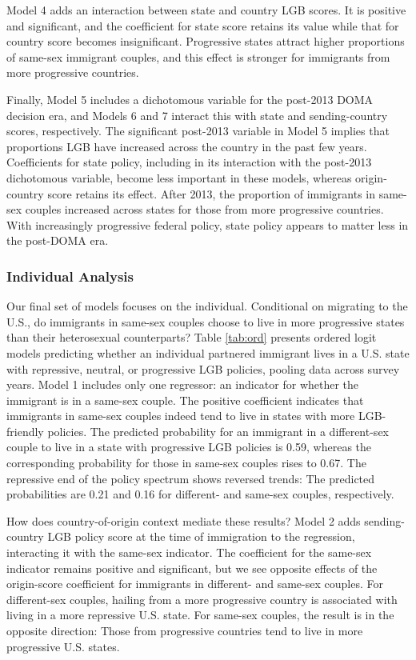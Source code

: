 \documentclass[
  11pt,
]{article}
\begin{document}
Model 4 adds an interaction between state and country LGB scores. It is positive and significant, and the coefficient for state score retains its value while that for country score becomes insignificant. Progressive states attract higher proportions of same-sex immigrant couples, and this effect is stronger for immigrants from more progressive countries.

Finally, Model 5 includes a dichotomous variable for the post-2013 DOMA decision era, and Models 6 and 7 interact this with state and sending-country scores, respectively. The significant post-2013 variable in Model 5 implies that proportions LGB have increased across the country in the past few years. Coefficients for state policy, including in its interaction with the post-2013 dichotomous variable, become less important in these models, whereas origin-country score retains its effect. After 2013, the proportion of immigrants in same-sex couples increased across states for those from more progressive countries. With increasingly progressive federal policy, state policy appears to matter less in the post-DOMA era.

\hypertarget{individual-analysis}{%
\subsubsection{Individual Analysis}\label{individual-analysis}}

Our final set of models focuses on the individual. Conditional on migrating to the U.S., do immigrants in same-sex couples choose to live in more progressive states than their heterosexual counterparts? Table \ref{tab:ord} presents ordered logit models predicting whether an individual partnered immigrant lives in a U.S. state with repressive, neutral, or progressive LGB policies, pooling data across survey years. Model 1 includes only one regressor: an indicator for whether the immigrant is in a same-sex couple. The positive coefficient indicates that immigrants in same-sex couples indeed tend to live in states with more LGB-friendly policies. The predicted probability for an immigrant in a different-sex couple to live in a state with progressive LGB policies is 0.59, whereas the corresponding probability for those in same-sex couples rises to 0.67. The repressive end of the policy spectrum shows reversed trends: The predicted probabilities are 0.21 and 0.16 for different- and same-sex couples, respectively.

How does country-of-origin context mediate these results? Model 2 adds sending-country LGB policy score at the time of immigration to the regression, interacting it with the same-sex indicator. The coefficient for the same-sex indicator remains positive and significant, but we see opposite effects of the origin-score coefficient for immigrants in different- and same-sex couples. For different-sex couples, hailing from a more progressive country is associated with living in a more repressive U.S. state. For same-sex couples, the result is in the opposite direction: Those from progressive countries tend to live in more progressive U.S. states.
\end{document}
